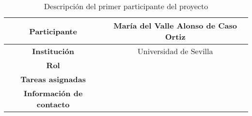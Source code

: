 \begin{table}[H]
    \centering
    \begin{tabular}{|c|c|}
    \hline
    \textbf{Participante} & María del Valle Alonso de Caso Ortiz \\
    \hline
    \textbf{Institución} & Universidad de Sevilla \\
    \hline
    \textbf{Rol} &  \\
    \hline
    \textbf{Tareas asignadas} & \\
    \hline
    \textbf{Información de contacto} & \\
    \hline
    \end{tabular}
\caption{Descripción del primer participante del proyecto}
\label{tab:primerParticipante}
\end{table}